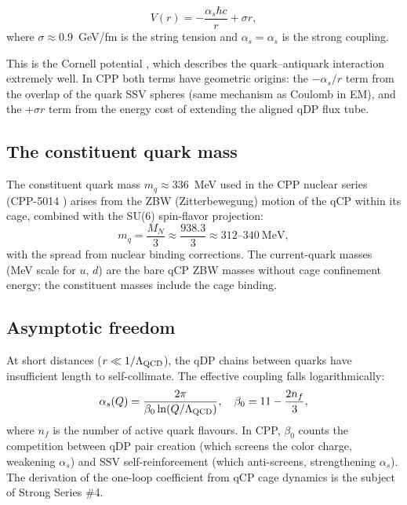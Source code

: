 \documentclass[11pt,a4paper]{article}
\newcommand{\as}{\alpha_s}
\begin{document}
\begin{equation}
V(r) = -\frac{\as\hbar c}{r} + \sigma r,
\label{eq:cornell}
\end{equation}
where $\sigma \approx 0.9$~GeV/fm is the string tension
\citep{bali2001} and $\as = \alpha_s$ is the strong coupling.

This is the Cornell potential \citep{cornell1978}, which describes
the quark--antiquark interaction extremely well.  In CPP both terms
have geometric origins: the $-\as/r$ term from the overlap of the
quark SSV spheres (same mechanism as Coulomb in EM), and the
$+\sigma r$ term from the energy cost of extending the aligned
qDP flux tube.

\subsection{The constituent quark mass}

The constituent quark mass $m_q \approx 336$~MeV used in the CPP
nuclear series (CPP-5014 \citep{cpp5014}) arises from the ZBW
(Zitterbewegung) motion of the qCP within its cage, combined with
the SU(6) spin-flavor projection:
\begin{equation}
m_q = \frac{M_N}{3} \approx \frac{938.3}{3} \approx 312\text{--}340~\text{MeV},
\label{eq:mqconst}
\end{equation}
with the spread from nuclear binding corrections.  The current-quark
masses (MeV scale for $u$, $d$) are the bare qCP ZBW masses without
cage confinement energy; the constituent masses include the cage
binding.

\subsection{Asymptotic freedom}

At short distances ($r \ll 1/\Lambda_{\rm QCD}$), the qDP chains
between quarks have insufficient length to self-collimate.  The
effective coupling falls logarithmically:
\begin{equation}
\as(Q) = \frac{2\pi}{\beta_0 \ln(Q/\Lambda_{\rm QCD})},
\quad \beta_0 = 11 - \frac{2n_f}{3},
\label{eq:running}
\end{equation}
where $n_f$ is the number of active quark flavours.  In CPP,
$\beta_0$ counts the competition between qDP pair creation (which
screens the color charge, weakening $\as$) and SSV self-reinforcement
(which anti-screens, strengthening $\as$).  The derivation of the
one-loop coefficient from qCP cage dynamics is the subject of Strong
Series \#4.
\end{document}
